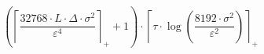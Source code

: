\[\left(\left\lceil \frac{32768 \cdot L \cdot \Delta \cdot \sigma^{2}}{\varepsilon^{4}} \right\rceil_{+} + 1\right) \cdot \left\lceil \tau \cdot \log\left(\frac{8192 \cdot \sigma^{2}}{\varepsilon^{2}}\right) \right\rceil_{+}\]

